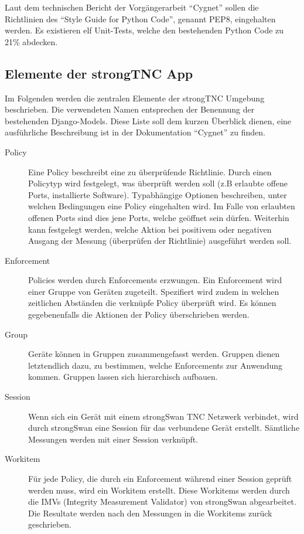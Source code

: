 Laut dem technischen Bericht der Vorgängerarbeit
\enquote{Cygnet}\cite{cygnet:2013} sollen die Richtlinien des \enquote{Style
Guide for Python Code}\cite{PEP8:2001}, genannt PEP8, eingehalten werden. Es
existieren elf Unit-Tests, welche den bestehenden Python Code zu 21\% abdecken.

\subsection{Elemente der strongTNC App} Im Folgenden werden die zentralen
Elemente der strongTNC Umgebung beschrieben. Die verwendeten Namen entsprechen
der Benennung der bestehenden Django-Models. Diese Liste soll dem kurzen Überblick dienen,
eine ausführliche Beschreibung ist in der Dokumentation
\enquote{Cygnet}\cite{cygnet:2013} zu finden.
\begin{description}
	\item[Policy] Eine Policy beschreibt eine zu überprüfende Richtlinie. Durch einen Policytyp wird
	festgelegt, was überprüft werden soll (z.B erlaubte offene Ports, installierte Software).
	Typabhängige Optionen beschreiben, unter welchen Bedingungen eine Policy eingehalten wird.
	Im Falle von erlaubten offenen Ports sind dies jene Ports, welche geöffnet sein dürfen.
	Weiterhin kann festgelegt werden, welche Aktion bei positivem oder negativen Ausgang der
	Messung (überprüfen der Richtlinie) ausgeführt werden soll.
	
	\item[Enforcement] Policies werden durch Enforcements erzwungen. 
	Ein Enforcement wird einer Gruppe von Geräten zugeteilt. Spezifiert wird zudem in welchen zeitlichen
	Abständen die verknüpfe Policy überprüft wird. Es können gegebenenfalls
	die Aktionen der Policy überschrieben werden.
	
	\item[Group] Geräte können in Gruppen zusammengefasst werden. Gruppen
	dienen letztendlich dazu, zu bestimmen, welche Enforcements zur Anwendung
	kommen. Gruppen lassen sich hierarchisch aufbauen.
		
	\item[Session] Wenn sich ein Gerät mit einem strongSwan TNC Netzwerk verbindet,
	wird durch strongSwan eine Session für das verbundene Gerät erstellt. Sämtliche
	Messungen werden mit einer Session verknüpft.
	
	\item[Workitem] Für jede Policy, die durch ein Enforcement während einer Session
	geprüft werden muss, wird ein Workitem erstellt. Diese Workitems werden durch
	die IMVs (Integrity Measurement Validator) von strongSwan abgearbeitet. Die
	Resultate werden nach den Messungen in die Workitems zurück geschrieben.
	

\end{description}
